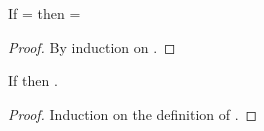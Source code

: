\begin{lemma} \label{appendix:lemma:pathindependent}
  If \inopenvnoeq{\openv{}}{\object{}} = 
  then \inopenvnoeq{\openv{}}{\path{\pathelem{}}{\object{}}} =
 \begin{proof}
   By induction on \pathelem{}.
%
%
%
%
 \end{proof}
\end{lemma}

\begin{lemma}[\classconst]\label{appendix:lemma:classconst}
  If
  {\opsem{\openv{}}{\appexp{\classconst{}}{\openv{}({\path{\pathelem{}}{\x{}}})}}{\class{}}} then
  {\satisfies{\openv{}}{\isprop{\class{}}{\path{\pathelem{}}{\x{}}}}}.

  \begin{proof}
    Induction on the definition of {\classconst{}}.
  \end{proof}
\end{lemma}

